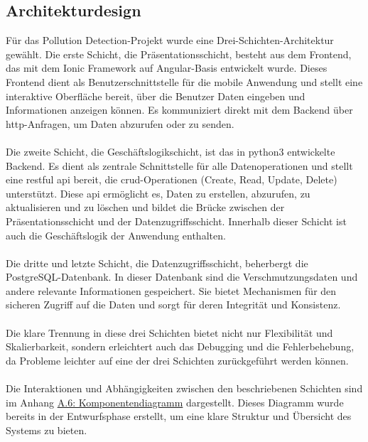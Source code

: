\documentclass[a4paper,12pt]{article}
\begin{document}
\subsection{Architekturdesign}
\label{sec:architekturdesign}
Für das \glqq Pollution Detection\grqq{}-Projekt wurde eine Drei-Schichten-Architektur gewählt. Die erste Schicht, die Präsentationsschicht, besteht aus dem Frontend, das mit dem Ionic Framework auf Angular-Basis entwickelt wurde. Dieses Frontend dient als Benutzerschnittstelle für die mobile Anwendung und stellt eine interaktive Oberfläche bereit, über die Benutzer Daten eingeben und Informationen anzeigen können. Es kommuniziert direkt mit dem Backend über \acrshort{http}-Anfragen, um Daten abzurufen oder zu senden.\\
\\
Die zweite Schicht, die Geschäftslogikschicht, ist das in \acrshort{python3} entwickelte Backend. Es dient als zentrale Schnittstelle für alle Datenoperationen und stellt eine \acrshort{restful} \acrshort{api} bereit, die \acrshort{crud}-Operationen (Create, Read, Update, Delete) unterstützt. Diese \acrshort{api} ermöglicht es, Daten zu erstellen, abzurufen, zu aktualisieren und zu löschen und bildet die Brücke zwischen der Präsentationsschicht und der Datenzugriffsschicht. Innerhalb dieser Schicht ist auch die Geschäftslogik der Anwendung enthalten.\\
\\
Die dritte und letzte Schicht, die Datenzugriffsschicht, beherbergt die PostgreSQL-Datenbank. In dieser Datenbank sind die Verschmutzungsdaten und andere relevante Informationen gespeichert. Sie bietet Mechanismen für den sicheren Zugriff auf die Daten und sorgt für deren Integrität und Konsistenz.\\
\\
Die klare Trennung in diese drei Schichten bietet nicht nur Flexibilität und Skalierbarkeit, sondern erleichtert auch das Debugging und die Fehlerbehebung, da Probleme leichter auf eine der drei Schichten zurückgeführt werden können.\\
\\
Die Interaktionen und Abhängigkeiten zwischen den beschriebenen Schichten sind im Anhang \hyperref[sec:komponentendiagramm]{A.6: Komponentendiagramm} dargestellt. Dieses Diagramm wurde bereits in der Entwurfsphase erstellt, um eine klare Struktur und Übersicht des Systems zu bieten.
\end{document}
